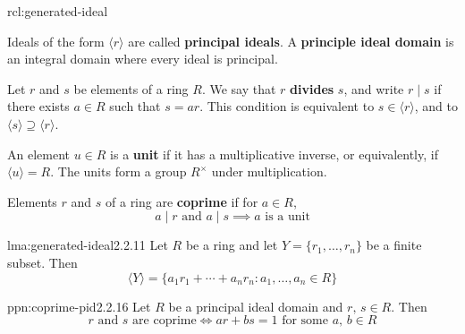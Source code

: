 \documentclass[landscape, 8pt]{extarticle}
\begin{document}
\begin{multicols}{3}
\begin{rcl}{rcl:generated-ideal}{}
    \longrule{0.08ex}
    \begin{itemize-zero}
        \item Ideals of the form $\langle r \rangle$ are called \textbf{principal ideals}. A \textbf{principle ideal domain} is an integral domain where every ideal is principal.
        \item Let $r$ and $s$ be elements of a ring $R$. We say that $r$ \textbf{divides} $s$, and write $r \mid s$ if there exists $a\in R$ such that $s = ar$. This condition is equivalent to $s\in \langle r \rangle$, and to $\langle s \rangle \supseteq \langle r \rangle$.
        \item An element $u\in R$ is a \textbf{unit} if it has a multiplicative inverse, or equivalently, if $\langle u \rangle = R$. The units form a group $R^{\times}$ under multiplication.
        \item Elements $r$ and $s$ of a ring are \textbf{coprime} if for $a\in R$,
            \[a \mid r \text{ and } a \mid s \implies a \text{ is a unit}\]
    \end{itemize-zero}
\end{rcl}

\begin{lma}{lma:generated-ideal}{2.2.11}
    Let $R$ be a ring and let $Y = \{r_{1},\dots,r_{n}\}$ be a finite subset. Then
    \[\langle Y \rangle = \{a_{1}r_{1} + \cdots + a_{n}r_{n} : a_{1},\dots, a_{n} \in R\}\]
\end{lma}

\begin{ppn}{ppn:coprime-pid}{2.2.16}
    Let $R$ be a principal ideal domain and $r,\,s\in R$. Then
    \[r \text{ and } s \text{ are coprime} \iff ar + bs = 1 \text{ for some } a,\,b\in R\]
\end{ppn}

\lipsum[1-12]
\end{multicols}
\end{document}

